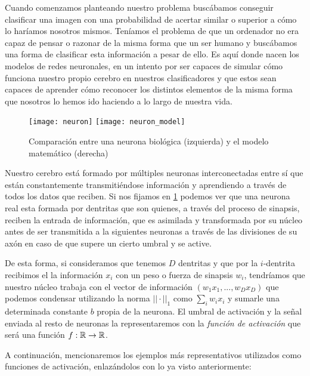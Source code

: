 Cuando comenzamos planteando nuestro problema buscábamos conseguir clasificar una imagen con una probabilidad de acertar similar o superior a cómo lo haríamos nosotros mismos. Teníamos el problema de que un ordenador no era capaz de pensar o razonar de la misma forma que un ser humano y buscábamos una forma de clasificar esta información a pesar de ello. Es aquí donde nacen los modelos de redes neuronales, en un intento por ser capaces de simular cómo funciona nuestro propio cerebro en nuestros clasificadores y que estos sean capaces de aprender cómo reconocer los distintos elementos de la misma forma que nosotros lo hemos ido haciendo a lo largo de nuestra vida.\newline

\begin{figure}[htpb]
  \centering
  \texttt{[image: neuron]}
  \vrule
  \texttt{[image: neuron\_model]}
  \caption{Comparación entre una neurona biológica (izquierda) y el modelo matemático (derecha) }
  \label{fig:neurona}
\end{figure}

Nuestro cerebro está formado por múltiples neuronas interconectadas entre sí que están constantemente transmitiéndose información y aprendiendo a través de todos los datos que reciben. Si nos fijamos en \ref{fig:neurona} podemos ver que una neurona real esta formada por dentritas que son quienes, a través del proceso de sinapsis, reciben la entrada de información, que es asimilada y transformada por su núcleo antes de ser transmitida a la siguientes neuronas a través de las divisiones de su axón en caso de que supere un cierto umbral y se active.\newline

De esta forma, si consideramos que tenemos $D$ dentritas y que por la $i$-dentrita recibimos el la información $x_i$ con un peso o fuerza de sinapsis $w_i$, tendríamos que nuestro núcleo trabaja con el vector de información $(w_1 x_1,...,w_D x_D)$ que podemos condensar utilizando la norma $||\cdot ||_1$ como $\sum_i w_i x_i $ y sumarle una determinada constante $b$ propia de la neurona. El umbral de activación y la señal enviada al resto de neuronas la representaremos con la \emph{función de activación}\label{def:ActivationFunction} que será una función $f: \mathbb{R} \to \mathbb{R}$. \newline

A continuación, mencionaremos los ejemplos más representativos utilizados como funciones de activación, enlazándolos con lo ya visto anteriormente:


